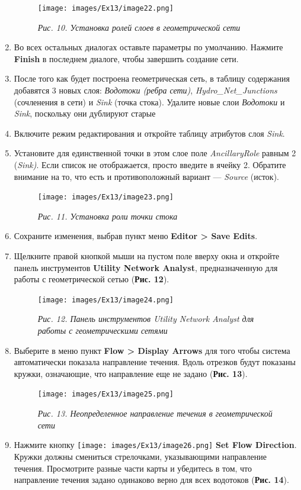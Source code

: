 \documentclass[12pt,]{book}
\begin{document}
\begin{enumerate}
  \begin{figure}
  \centering
  \texttt{[image: images/Ex13/image22.png]}
  \caption{\emph{Рис. 10. Установка ролей слоев в геометрической сети}}
  \end{figure}
\item
  Во всех остальных диалогах оставьте параметры по умолчанию. Нажмите \textbf{Finish} в последнем диалоге, чтобы завершить создание сети.
\item
  После того как будет построена геометрическая сеть, в таблицу содержания добавятся 3 новых слоя: \emph{Водотоки (ребра сети)}, \emph{Hydro\_Net\_Junctions} (сочленения в сети) и \emph{Sink} (точка стока). Удалите новые слои \emph{Водотоки} и \emph{Sink}, поскольку они дублируют старые
\item
  Включите режим редактирования и откройте таблицу атрибутов слоя \emph{Sink}.
\item
  Установите для единственной точки в этом слое поле \emph{AncillaryRole} равным 2 (\emph{Sink)}. Если список не отображается, просто введите в ячейку 2. Обратите внимание на то, что есть и противоположный вариант --- \emph{Source} (исток).

  \begin{figure}
  \centering
  \texttt{[image: images/Ex13/image23.png]}
  \caption{\emph{Рис. 11. Установка роли точки стока}}
  \end{figure}
\item
  Сохраните изменения, выбрав пункт меню \textbf{Editor \textgreater{} Save Edits}.
\item
  Щелкните правой кнопкой мыши на пустом поле вверху окна и откройте панель инструментов \textbf{Utility Network Analyst}, предназначенную для работы с геометрической сетью (\textbf{Рис. 12}).

  \begin{figure}
  \centering
  \texttt{[image: images/Ex13/image24.png]}
  \caption{\emph{Рис. 12. Панель инструментов Utility Network Analyst для работы с геометрическими сетями}}
  \end{figure}
\item
  Выберите в меню пункт \textbf{Flow \textgreater{} Display Arrows} для того чтобы система автоматически показала направление течения. Вдоль отрезков будут показаны кружки, означающие, что направление еще не задано (\textbf{Рис. 13}).

  \begin{figure}
  \centering
  \texttt{[image: images/Ex13/image25.png]}
  \caption{\emph{Рис. 13. Неопределенное направление течения в геометрической сети}}
  \end{figure}
\item
  Нажмите кнопку \texttt{[image: images/Ex13/image26.png]} \textbf{Set Flow Direction}. Кружки должны смениться стрелочками, указывающими направление течения. Просмотрите разные части карты и убедитесь в том, что направление течения задано одинаково верно для всех водотоков (\textbf{Рис. 14}).


\end{enumerate}
\end{document}

